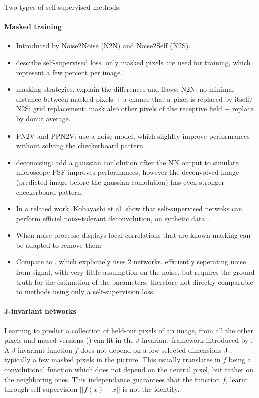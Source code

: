\documentclass{article}
\begin{document}
Two types of self-supervised methods:
\paragraph{Masked training}
\begin{itemize}
\item Introduced by Noise2Noise\cite{krull2018noise2void} (N2N) and Noise2Self \cite{batson2019noise2self} (N2S).
\item describe self-supervised loss. only masked pixels are used for training, which represent a few percent per image.
\item masking strategies. explain the differences and flaws: N2N: no minimal distance between masked pixels + a chance that a pixel is replaced by itself/ N2S: grid replacement: mask also other pixels of the receptive field + replace by donut average.
\item PN2V\cite{krull2019probabilistic} and PPN2V\cite{prakash2020fully}: use a noise model, which slighlty improve performances without solving the checkerboard pattern.
\item deconoising:\cite{goncharova2020} add a gaussian conlolution after the NN output to simulate microscope PSF improves performances, however the deconvolved image (predicted image before the gaussian conlolution) has even stronger checkerboard pattern.
\item In a related work, Kobayashi et al. show that self-supervised netwoks can perform efficiel noise-tolerant deconvolution, on sythetic data \cite{kobayashi2020image}.
\item When noise processe displays local correlations that are known masking can be adapted to remove them \cite{broaddus2020removing}
\item Compare to \cite{yue2019variational}, which explicitely uses 2 networks, efficiently seperating noise from signal, with very little assumption on the noise, but requires the ground truth for the estimation of the parameters, therefore not directly comparable to methods using only a self-supervision loss.
\end{itemize}

\paragraph{J-invariant networks}
Learning to predict a collection of held-out pixels of an image, from all the other pixels and mased versions (\cite{krull2018noise2void}) can fit in the
J-invariant framework introduced by \cite{batson2019noise2self}. A J-invariant function $f$ does not depend on a few selected dimensions J ; typically a few masked pixels
in the picture. This usually translates in $f$ being a convolutional function which does not depend on the central pixel, but rather on the neighboring ones. This independance guarantees that the function $f$, learnt through self supervision $||f(x) - x||$ is not the identity.
\end{document}
